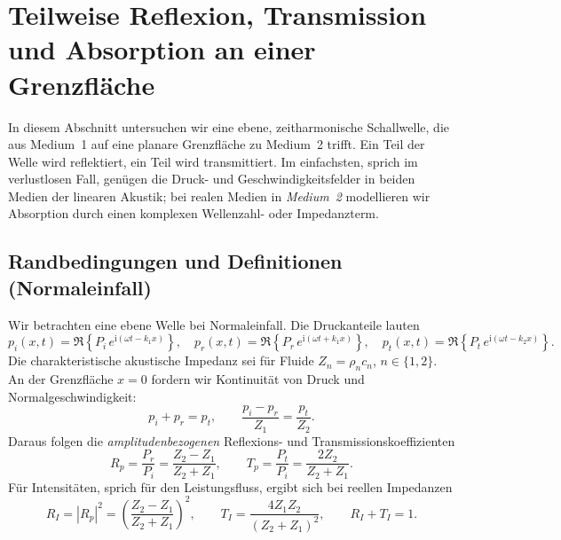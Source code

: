 %
%
%
%
\section{Teilweise Reflexion, Transmission und Absorption an einer Grenzfläche
\label{schall:section:teil2}}

In diesem Abschnitt untersuchen wir eine ebene, zeit\-harmonische Schallwelle, die aus Medium~1 auf eine planare Grenzfläche zu Medium~2 trifft.
Ein Teil der Welle wird reflektiert, ein Teil wird transmittiert.
Im einfachsten, sprich im verlustlosen Fall, genügen die Druck- und Geschwindigkeitsfelder in beiden Medien der linearen Akustik; bei realen Medien in \emph{Medium~2} modellieren wir Absorption durch einen komplexen Wellenzahl- oder Impedanzterm.

\subsection{Randbedingungen und Definitionen (Normal\-einfall)}
Wir betrachten eine ebene Welle bei Normal\-einfall.
Die Druckanteile lauten
\[
    p_i(x,t)=\Re\!\left\{P_i\,e^{\mathrm{i}(\omega t-k_1 x)}\right\},\quad
    p_r(x,t)=\Re\!\left\{P_r\,e^{\mathrm{i}(\omega t+k_1 x)}\right\},\quad
    p_t(x,t)=\Re\!\left\{P_t\,e^{\mathrm{i}(\omega t-k_2 x)}\right\}.
\]
Die charakteristische akustische Impedanz sei für Fluide $Z_n=\rho_n c_n$, $n\in\{1,2\}$.
An der Grenzfläche $x=0$ fordern wir Kontinuität von Druck und Normalgeschwindigkeit:
\[
    p_i+p_r=p_t,\qquad \frac{p_i-p_r}{Z_1}=\frac{p_t}{Z_2}.
\]
Daraus folgen die \emph{amplitudenbezogenen} Reflexions- und Transmissionskoeffizienten
\begin{equation}
    R_p=\frac{P_r}{P_i}=\frac{Z_2-Z_1}{Z_2+Z_1},
    \qquad
    T_p=\frac{P_t}{P_i}=\frac{2Z_2}{Z_2+Z_1}.
    \label{eq:RpTp}
\end{equation}
Für Intensitäten, sprich für den Leistungsfluss, ergibt sich bei reellen Impedanzen \cite{schall:kinsler, schall:allenRT}
\begin{equation}
    R_I=\left|R_p\right|^2=\left(\frac{Z_2-Z_1}{Z_2+Z_1}\right)^2,\qquad
    T_I=\frac{4Z_1Z_2}{(Z_2+Z_1)^2},
    \qquad
    R_I+T_I=1.
    \label{eq:RI_TI}
\end{equation}


